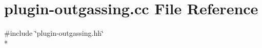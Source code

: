 \hypertarget{plugin-outgassing_8cc}{\section{plugin-\/outgassing.cc File Reference}
\label{plugin-outgassing_8cc}
}
{\ttfamily \#include \char`\"{}plugin-\/outgassing.\-hh\char`\"{}}\\*
